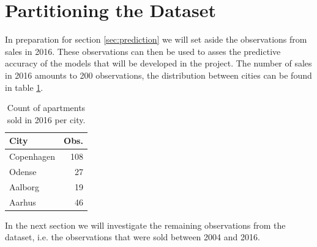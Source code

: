 \section{Partitioning the Dataset}
In preparation for section \ref{sec:prediction} we will set aside the observations from sales in 2016.
These observations can then be used to asses the predictive accuracy of the models that will be developed in the project.
The number of sales in 2016 amounts to 200 observations, the distribution between cities can be found in table \ref{tbl:2016_obs_per_city}.
\begin{table}[H]
    \centering
    \begin{tabular}{lr}
        \toprule
        \textbf{City} & \textbf{Obs.}\\
        \midrule
        Copenhagen & 108\\
        Odense & 27\\
        Aalborg & 19\\
        Aarhus & 46\\
        \bottomrule
    \end{tabular}
    \caption{Count of apartments sold in 2016 per city.}
    \label{tbl:2016_obs_per_city}
\end{table}
In the next section we will investigate the remaining observations from the dataset, i.e. the observations that were sold between 2004 and 2016.

